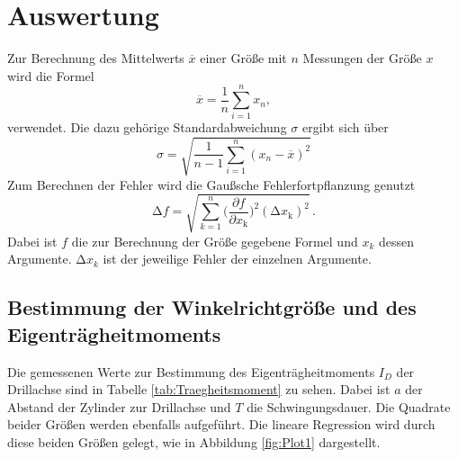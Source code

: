 \section{Auswertung}
\label{sec:Auswertung}
Zur Berechnung des Mittelwerts $\overline{x}$ einer Größe mit $n$ Messungen der Größe $x$ wird die Formel 
\begin{equation}
  \overline{x}=\frac{1}{n}\sum_{i=1}^n x_n,
  \label{eq:Mittelwert}
\end{equation} verwendet.
Die dazu gehörige Standardabweichung $\sigma$ ergibt sich über 
\begin{equation}
  \sigma=\sqrt{\frac{1}{n-1}\sum_{i=1}^n(x_n-\overline{x})^2}
  \label{eq:Standardabweichung}
\end{equation}
Zum Berechnen der Fehler wird die Gaußsche Fehlerfortpflanzung genutzt 
\begin{equation}
\increment f=\sqrt{\sum_{k=1}^{n}\biggl(\frac{\partial f}{\partial x_\text{k}}\biggr)^2(\increment x_\text{k})^2}\,.
\label{eq:gauss}
\end{equation}
Dabei ist $f$ die zur Berechnung der Größe gegebene Formel und $x_k$ dessen Argumente.
$\increment x_k$ ist der jeweilige Fehler der einzelnen Argumente.\\ \noindent 
\newpage

\subsection{Bestimmung der Winkelrichtgröße und des Eigenträgheitmoments}

Die gemessenen Werte zur Bestimmung des Eigenträgheitmoments $I_D$ der Drillachse sind in Tabelle \ref{tab:Traegheitsmoment} zu sehen.
Dabei ist $a$ der Abstand der Zylinder zur Drillachse und $T$ die Schwingungsdauer.
Die Quadrate beider Größen werden ebenfalls aufgeführt.
Die lineare Regression wird durch diese beiden Größen gelegt, wie in Abbildung \ref{fig:Plot1} dargestellt.

